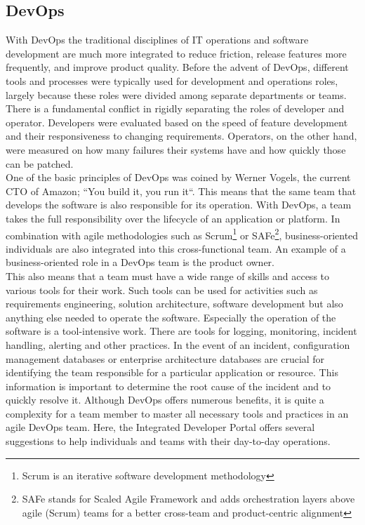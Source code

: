 \documentclass[a4paper,10pt]{article}
\begin{document}
    \subsection{DevOps}
    \label{subsec:devops}
    With DevOps the traditional disciplines of IT operations and software development are much more integrated to
    reduce friction, release features more frequently, and improve product quality\parencite{safedevops}.
    Before the advent of DevOps, different tools and processes were typically used for development and operations roles,
    largely because these roles were divided among separate departments or teams.
    There is a fundamental conflict in rigidly separating the roles of developer and operator.
    Developers were evaluated based on the speed of feature development and their responsiveness to changing requirements.
    Operators, on the other hand, were measured on how many failures their systems have and how quickly those can be patched.\\
    One of the basic principles of DevOps was coined by Werner Vogels, the current CTO of Amazon;
    ``You build it, you run it``\parencite{vogels}.
    This means that the same team that develops the software is also responsible for its operation.
    With DevOps, a team takes the full responsibility over the lifecycle of an application or platform.
    In combination with agile methodologies such as Scrum\footnote{Scrum is an iterative software development methodology}
    or SAFe\footnote{SAFe stands for Scaled Agile Framework and adds orchestration layers above agile (Scrum) teams for
    a better cross-team and product-centric alignment}, business-oriented individuals are also integrated into this
    cross-functional team.
    An example of a business-oriented role in a DevOps team is the product owner\parencite{safepo}.\\
    This also means that a team must have a wide range of skills and access to various tools for their work.
    Such tools can be used for activities such as requirements engineering, solution architecture, software development
    but also anything else needed to operate the software.
    Especially the operation of the software is a tool-intensive work.
    There are tools for logging, monitoring, incident handling, alerting and other practices.
    In the event of an incident, configuration management databases or enterprise architecture databases are crucial for
    identifying the team responsible for a particular application or resource.
    This information is important to determine the root cause of the incident and to quickly resolve it.
    Although DevOps offers numerous benefits, it is quite a complexity for a team member to master all necessary tools and
    practices in an agile DevOps team.
    Here, the Integrated Developer Portal offers several suggestions to help individuals and teams with their day-to-day operations.
\end{document}
